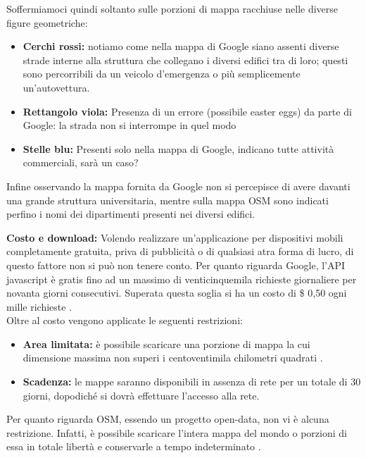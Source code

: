 Soffermiamoci quindi soltanto sulle porzioni di mappa racchiuse nelle diverse figure geometriche:

\begin{itemize}
\item \textbf{Cerchi rossi:} notiamo come nella mappa di Google siano assenti diverse strade interne alla struttura che collegano i diversi edifici tra di loro; questi sono percorribili da un veicolo d'emergenza o più semplicemente un'autovettura.
\item \textbf{Rettangolo viola:} Presenza di un errore (possibile easter eggs) da parte di Google: la strada non si interrompe in quel modo
\item \textbf{Stelle blu:} Presenti solo nella mappa di Google, indicano tutte attività commerciali, sarà un caso?
\end{itemize} 

Infine osservando la mappa fornita da Google non si percepisce di avere davanti una grande struttura universitaria, mentre sulla mappa OSM sono indicati perfino i nomi dei dipartimenti presenti nei diversi edifici. \newpage

\textbf{Costo e download:} Volendo realizzare un'applicazione per dispositivi mobili completamente gratuita, priva di pubblicità o di qualsiasi atra forma di lucro, di questo fattore non si può non tenere conto.
Per quanto riguarda Google, l'API javascript è gratis fino ad un massimo di venticinquemila richieste giornaliere per novanta giorni consecutivi. Superata questa soglia si ha un costo di \$ 0,50 ogni mille richieste \cite{GOOGLE_PLAN}. \\
Oltre al costo vengono applicate le seguenti restrizioni:

\begin{itemize}
\item \textbf{Area limitata:} è possibile scaricare una porzione di mappa la cui dimensione massima non superi i centoventimila chilometri quadrati              \cite{GOOGLE_OFFLINE}.
\item \textbf{Scadenza:} le mappe saranno disponibili in assenza di rete per un totale di 30 giorni, dopodiché si dovrà effettuare l'accesso alla rete.
\end{itemize}

Per quanto riguarda OSM, essendo un progetto open-data, non vi è alcuna restrizione. Infatti, è possibile scaricare l'intera mappa del mondo o porzioni di essa in totale libertà e conservarle a tempo indeterminato \cite{LINK_PLANET}.
\newpage

